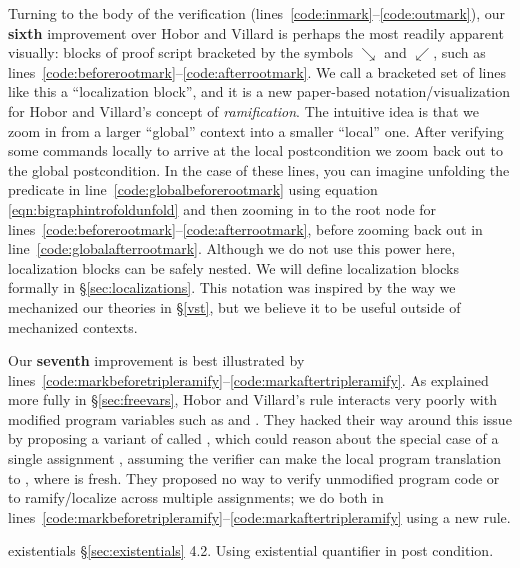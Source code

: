 Turning to the body of the verification (lines~\ref{code:inmark}--\ref{code:outmark}), our \textbf{sixth} improvement over Hobor and Villard is perhaps the most readily apparent visually: blocks of proof script bracketed by the symbols $\searrow$ and $\swarrow$, such as lines~\ref{code:beforerootmark}--\ref{code:afterrootmark}.  We call a bracketed set of lines like this a ``localization block'', and it is a new paper-based notation/visualization for Hobor and Villard's concept of \emph{ramification}.  The intuitive idea is that we zoom in from a larger ``global'' context into a smaller ``local'' one.  After verifying some commands locally to arrive at the local postcondition we zoom back out to the global postcondition. In the case of these lines, you can imagine unfolding the  predicate in line~\ref{code:globalbeforerootmark} using equation \eqref{eqn:bigraphintrofoldunfold} and then zooming in to the root node  for lines~\ref{code:beforerootmark}--\ref{code:afterrootmark}, before zooming back out in line~\ref{code:globalafterrootmark}.  Although we do not use this power here, localization blocks can be safely nested.  We will define localization blocks formally in \S\ref{sec:localizations}.
This notation was inspired by the way we mechanized our theories in \S\ref{vst}, but we believe it to be useful outside of mechanized contexts.

Our \textbf{seventh} improvement is best illustrated by lines~\ref{code:markbeforetripleramify}--\ref{code:markaftertripleramify}.  As explained more fully in \S\ref{sec:freevars}, Hobor and Villard's  rule interacts very poorly with modified program variables such as  and .  They hacked their way around this issue by proposing a variant of  called , which could reason about the special case of a single assignment , assuming the verifier can make the local program translation to , where  is fresh.  They proposed no way to verify unmodified program code or to ramify/localize across multiple assignments; we do both in lines~\ref{code:markbeforetripleramify}--\ref{code:markaftertripleramify} using a new  rule.




{\color{magenta} 
existentials \S\ref{sec:existentials} 4.2. Using existential quantifier in post condition.
}

